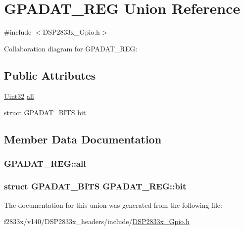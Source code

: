 \hypertarget{union_g_p_a_d_a_t___r_e_g}{}\section{G\+P\+A\+D\+A\+T\+\_\+\+R\+E\+G Union Reference}
\label{union_g_p_a_d_a_t___r_e_g}


{\ttfamily \#include $<$D\+S\+P2833x\+\_\+\+Gpio.\+h$>$}



Collaboration diagram for G\+P\+A\+D\+A\+T\+\_\+\+R\+E\+G\+:
\subsection*{Public Attributes}
\begin{DoxyCompactItemize}
\item 
\hyperlink{_d_s_p2833x___device_8h_aba99025e657f892beb7ff31cecf64653}{Uint32} \hyperlink{union_g_p_a_d_a_t___r_e_g_a529384777c9a527658109b0a00d472e1}{all}
\item 
struct \hyperlink{struct_g_p_a_d_a_t___b_i_t_s}{G\+P\+A\+D\+A\+T\+\_\+\+B\+I\+T\+S} \hyperlink{union_g_p_a_d_a_t___r_e_g_ab89336279405e10b3735b2cfa53f9c74}{bit}
\end{DoxyCompactItemize}


\subsection{Member Data Documentation}
\hypertarget{union_g_p_a_d_a_t___r_e_g_a529384777c9a527658109b0a00d472e1}{}
\subsubsection[{all}]{ G\+P\+A\+D\+A\+T\+\_\+\+R\+E\+G\+::all}\label{union_g_p_a_d_a_t___r_e_g_a529384777c9a527658109b0a00d472e1}
\hypertarget{union_g_p_a_d_a_t___r_e_g_ab89336279405e10b3735b2cfa53f9c74}{}
\subsubsection[{bit}]{\setlength{\rightskip}{0pt plus 5cm}struct {\bf G\+P\+A\+D\+A\+T\+\_\+\+B\+I\+T\+S} G\+P\+A\+D\+A\+T\+\_\+\+R\+E\+G\+::bit}\label{union_g_p_a_d_a_t___r_e_g_ab89336279405e10b3735b2cfa53f9c74}


The documentation for this union was generated from the following file\+:\begin{DoxyCompactItemize}
\item 
f2833x/v140/\+D\+S\+P2833x\+\_\+headers/include/\hyperlink{_d_s_p2833x___gpio_8h}{D\+S\+P2833x\+\_\+\+Gpio.\+h}\end{DoxyCompactItemize}
